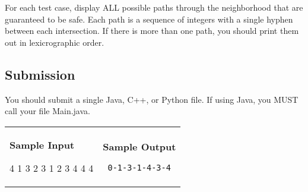 \documentclass[11pt]{article}
\begin{document}
For each test case, display ALL possible paths through the neighborhood that are guaranteed to be safe. Each path is a sequence of integers with a single hyphen between each intersection. If there is more than one path, you should print them out in lexicrographic order.

\subsection*{Submission}

You should submit a single Java, C++, or Python file. If using Java, you MUST call your file Main.java. 


\vspace{0.25in}\hspace{-0.3in}\begin{tabular}{ll}

\parbox{3in}{{\large\bf Sample Input}

\vspace{0.15in}

{\tt 

4 1 3 2 3 1 2 3 4 4 4
}
}

&

\parbox{3in}{{\large\bf Sample Output}

\vspace{0.15in}

{\tt
0-1-3-1-4-3-4\linebreak
}
}

\\
\end{tabular}
\end{document}
